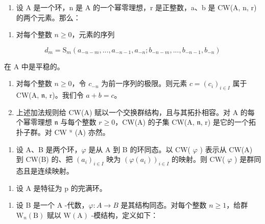 \begin{enumerate}
\def\labelenumi{\alph{enumi})}
\setcounter{enumi}{2}
\tightlist
\item
  设 A 是一个环，n 是 A 的一个幂零理想，r 是正整数，a、b 是 CW(A, n, r) 的两个元素。那么：
\end{enumerate}

\begin{enumerate}
\def\labelenumi{(\roman{enumi})}
\tightlist
\item
  对每个整数 \(n \geqslant 0\)，元素的序列
\end{enumerate}

\[
d _ {m} = \mathrm{S} _ {m} (a _ {- n - m},..., a _ {- n - 1}, a _ {- n}; b _ {- n - m},..., b _ {- n - 1}, b _ {- n})
\]

在 A 中是平稳的。

\begin{enumerate}
\def\labelenumi{(\roman{enumi})}
\setcounter{enumi}{1}
\item
  对每个整数 \(n \geqslant 0\)，令 \(c_{-n}\) 为前一序列的极限。则元素 \(c = (c_i)_{i \in I}\) 属于 CW(A, \(\mathfrak{n}\), r)。我们令 \(a + b = c\)。
\item
  上述加法规则给 CW(A) 赋以一个交换群结构，且与其拓扑相容。对 A 的每个幂零理想 \(\mathfrak{n}\) 与每个整数 \(r \geqslant 0\)，CW(A) 的子集 CW(A, \(\mathfrak{n}\), r) 是它的一个拓扑子群。对 CW \(^{u}\) (A) 亦然。
\end{enumerate}

\begin{enumerate}
\def\labelenumi{\alph{enumi})}
\setcounter{enumi}{3}
\tightlist
\item
  设 A、B 是两个环，\(\varphi\) 是从 A 到 B 的环同态。以 CW( \(\varphi\) ) 表示从 CW(A) 到 CW(B) 的、把 \((a_i)_{i\in I}\) 映为 \((\varphi(a_i))_{i\in I}\) 的映射。则 CW( \(\varphi\) ) 是群同态且是连续映射。
\end{enumerate}

\begin{enumerate}
\def\labelenumi{\arabic{enumi})}
\setcounter{enumi}{24}
\tightlist
\item
  设 A 是特征为 p 的完满环。
\end{enumerate}

\begin{enumerate}
\def\labelenumi{\alph{enumi})}
\tightlist
\item
  设 B 是一个 A -代数，\(\varphi: A \to B\) 是其结构同态。对每个整数 \(n \geqslant 1\)，给群 \(\mathrm{W}_{n}(\mathrm{B})\) 赋以 \(\mathrm{W}(\mathrm{A})\) -模结构，定义如下：
\end{enumerate}

